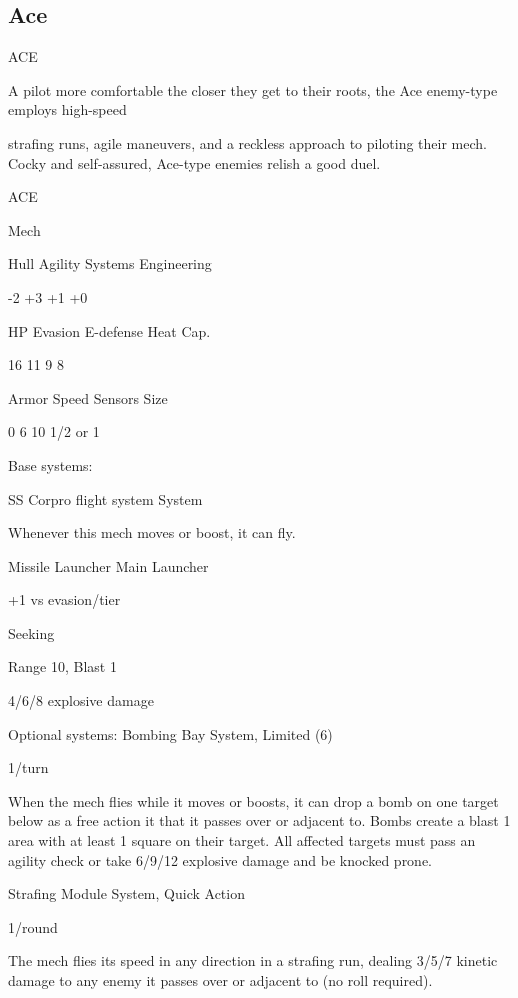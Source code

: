 \subsection{Ace}
                                                  ACE  

A pilot more comfortable the closer they get to their roots, the Ace enemy-type employs high-speed  

strafing runs, agile maneuvers, and a reckless approach to piloting their mech. Cocky and self-assured,  
Ace-type enemies relish a good duel.  
 

 ACE 

 Mech 

 Hull       Agility     Systems       Engineering 

 -2         +3          +1            +0 

 HP         Evasion     E-defense     Heat Cap. 

 16         11          9             8 

 Armor      Speed       Sensors       Size 

 0          6           10            1/2 or 1 

Base systems:
 
SS Corpro flight system  
System
 
Whenever this mech moves or boost, it can fly.
 

Missile Launcher  
Main Launcher
 
+1 vs evasion/tier
 
Seeking
 
Range 10, Blast 1
 
4/6/8 explosive damage
 

Optional systems:  
Bombing Bay  
System, Limited (6)
 
1/turn
 
When the mech flies while it moves or boosts, it can drop a bomb on one target below as a free  
action it that it passes over or adjacent to. Bombs create a blast 1 area with at least 1 square on  
their target. All affected targets must pass an agility check or take 6/9/12 explosive damage and  
be knocked prone.
 

                                                                                                       


Strafing Module  
System, Quick Action
 
1/round
 
The mech flies its speed in any direction in a strafing run, dealing 3/5/7 kinetic damage to any  
enemy it passes over or adjacent to (no roll required).
 

